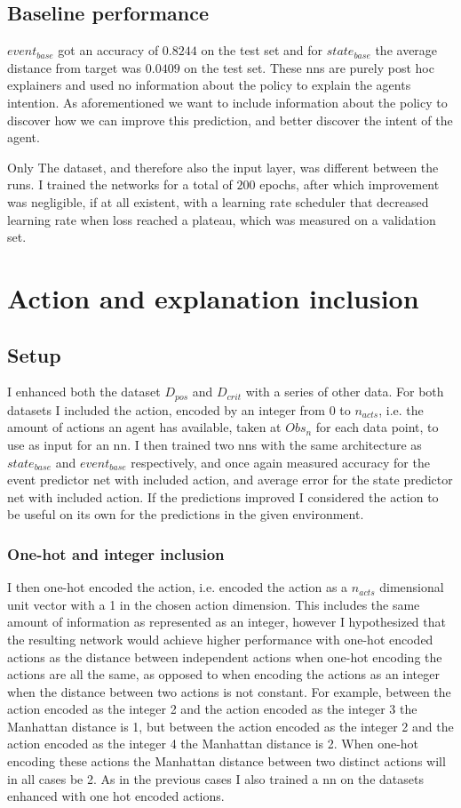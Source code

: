 \documentclass[UKenglish]{uiomasterthesis}
\begin{document}
\subsection{Baseline performance}
$event_{base}$ got an accuracy of $0.8244$ on the test set and for $state_{base}$ the average distance from target was $0.0409$ on the test set. These \acp{nn} are purely post hoc explainers and used no information about the policy to explain the agents intention. As aforementioned we want to include information about the policy to discover how we can improve this prediction, and better discover the intent of the agent.

 Only The dataset, and therefore also the input layer, was different between the runs. I trained the networks for a total of $200$ epochs, after which improvement was negligible, if at all existent, with a learning rate scheduler that decreased learning rate when loss reached a plateau, which was measured on a validation set.

\section{Action and explanation inclusion}
\subsection{Setup}
I enhanced both the dataset $D_{pos}$ and $D_{crit}$ with a series of other data. For both datasets I included the action, encoded by an integer from $0$ to $n_{acts}$, i.e. the amount of actions an agent has available, taken at $Obs_n$ for each data point, to use as input for an \ac{nn}. I then trained two \acp{nn} with the same architecture as $state_{base}$ and $event_{base}$ respectively, and once again measured accuracy for the event predictor net with included action, and average error for the state predictor net with included action. If the predictions improved I considered the action to be useful on its own for the predictions in the given environment.

\subsubsection{One-hot and integer inclusion}
I then one-hot encoded the action, i.e. encoded the action as a $n_{acts}$ dimensional unit vector with a 1 in the chosen action dimension. This includes the same amount of information as represented as an integer, however I hypothesized that the resulting network would achieve higher performance with one-hot encoded actions as the distance between independent actions when one-hot encoding the actions are all the same, as opposed to when encoding the actions as an integer when the distance between two actions is not constant. For example, between the action encoded as the integer 2 and the action encoded as the integer 3 the Manhattan distance is 1, but between the action encoded as the integer 2 and the action encoded as the integer 4 the Manhattan distance is 2. When one-hot encoding these actions the Manhattan distance between two distinct actions will in all cases be 2. As in the previous cases I also trained a \ac{nn} on the datasets enhanced with one hot encoded actions.
\end{document}
